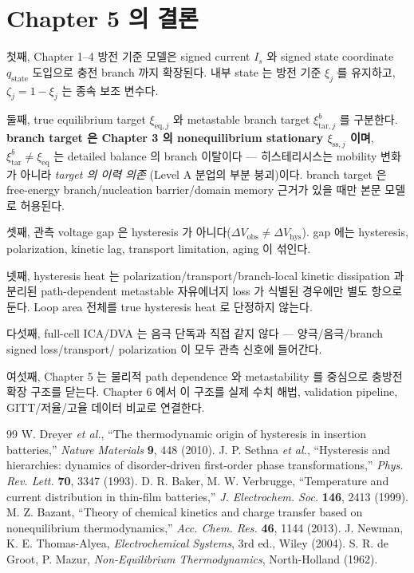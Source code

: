 \documentclass[11pt,a4paper]{article}
\newcommand{\eq}{\mathrm{eq}}
\newcommand{\hys}{\mathrm{hys}}
\newcommand{\obs}{\mathrm{obs}}
\newcommand{\tar}{\mathrm{tar}}
\newcommand{\stt}{\mathrm{state}}
\newcommand{\sstat}{\mathrm{ss}}
\begin{document}
\section{Chapter 5 의 결론}\label{sec:ch5_concl}
첫째, Chapter 1--4 방전 기준 모델은 signed current $I_s$ 와 signed state coordinate $q_\stt$ 도입으로 충전
branch 까지 확장된다. 내부 state 는 방전 기준 $\xi_j$ 를 유지하고, $\zeta_j=1-\xi_j$ 는 종속 보조 변수다.

둘째, true equilibrium target $\xi_{\eq,j}$ 와 metastable branch target $\xi_{\tar,j}^b$ 를 구분한다.
\textbf{branch target 은 Chapter 3 의 nonequilibrium stationary $\xi_{\sstat,j}$ 이며}, $\xi_{\tar}^b\ne\xi_{\eq}$
는 detailed balance 의 branch 이탈이다 — 히스테리시스는 mobility 변화가 아니라 \emph{target 의 이력 의존}
(Level A 분업의 부분 붕괴)이다. branch target 은 free-energy branch/nucleation barrier/domain memory 근거가
있을 때만 본문 모델로 허용된다.

셋째, 관측 voltage gap 은 hysteresis 가 아니다($\Delta V_\obs\ne\Delta V_\hys$). gap 에는 hysteresis,
polarization, kinetic lag, transport limitation, aging 이 섞인다.

넷째, hysteresis heat 는 polarization/transport/branch-local kinetic dissipation 과 분리된 path-dependent
metastable 자유에너지 loss 가 식별된 경우에만 별도 항으로 둔다. Loop area 전체를 true hysteresis heat 로
단정하지 않는다.

다섯째, full-cell ICA/DVA 는 음극 단독과 직접 같지 않다 — 양극/음극/branch signed loss/transport/
polarization 이 모두 관측 신호에 들어간다.

여섯째, Chapter 5 는 물리적 path dependence 와 metastability 를 중심으로 충방전 확장 구조를 닫는다.
Chapter 6 에서 이 구조를 실제 수치 해법, validation pipeline, GITT/저율/고율 데이터 비교로 연결한다.

\begin{thebibliography}{99}
 W. Dreyer \emph{et al.}, ``The thermodynamic origin of hysteresis in insertion batteries,'' \emph{Nature Materials} \textbf{9}, 448 (2010).
 J. P. Sethna \emph{et al.}, ``Hysteresis and hierarchies: dynamics of disorder-driven first-order phase transformations,'' \emph{Phys. Rev. Lett.} \textbf{70}, 3347 (1993).
 D. R. Baker, M. W. Verbrugge, ``Temperature and current distribution in thin-film batteries,'' \emph{J. Electrochem. Soc.} \textbf{146}, 2413 (1999).
 M. Z. Bazant, ``Theory of chemical kinetics and charge transfer based on nonequilibrium thermodynamics,'' \emph{Acc. Chem. Res.} \textbf{46}, 1144 (2013).
 J. Newman, K. E. Thomas-Alyea, \emph{Electrochemical Systems}, 3rd ed., Wiley (2004).
 S. R. de Groot, P. Mazur, \emph{Non-Equilibrium Thermodynamics}, North-Holland (1962).
\end{thebibliography}
\end{document}
